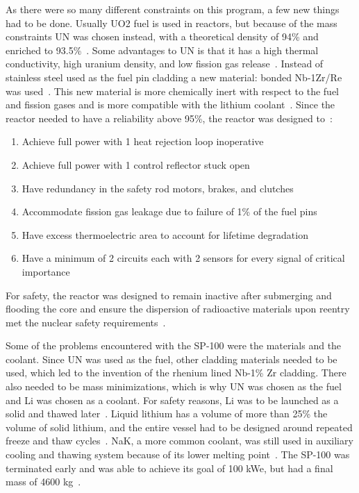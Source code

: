 \documentclass{article}
\begin{document}
As there were so many different constraints on this program, a few new things had to be done. Usually UO2 fuel is used in reactors, but because of the mass constraints UN was chosen instead, with a theoretical density of 94\% and enriched to 93.5\%~\cite{demuth2003sp100}. Some advantages to UN is that it has a high thermal conductivity, high uranium density, and low fission gas release~\cite{el1992decay}. Instead of stainless steel used as the fuel pin cladding a new material: bonded Nb-1Zr/Re was used~\cite{el1992decay}. This new material is more chemically inert with respect to the fuel and fission gases and is more compatible with the lithium coolant~\cite{demuth2003sp100}. Since the reactor needed to have a reliability above 95\%, the reactor was designed to~\cite{demuth2003sp100}:
\begin{enumerate}
\item Achieve full power with 1 heat rejection loop inoperative
\item Achieve full power with 1 control reflector stuck open
\item Have redundancy in the safety rod motors, brakes, and clutches
\item Accommodate fission gas leakage due to failure of 1\% of the fuel pins
\item Have excess thermoelectric area to account for lifetime degradation
\item Have a minimum of 2 circuits each with 2 sensors for every signal of critical importance
\end{enumerate}

For safety, the reactor was designed to remain inactive after submerging and flooding the core and ensure the dispersion of radioactive materials upon reentry met the nuclear safety requirements~\cite{anderson1983power}.


    Some of the problems encountered with the SP-100 were the materials and the coolant. Since UN was used as the fuel, other cladding materials needed to be used, which led to the invention of the rhenium lined Nb-1\% Zr cladding. There also needed to be mass minimizations, which is why UN was chosen as the fuel and Li was chosen as a coolant. For safety reasons, Li was to be launched as a solid and thawed later~\cite{anderson1983power}. Liquid lithium has a volume of more than 25\% the volume of solid lithium, and the entire vessel had to be designed around repeated freeze and thaw cycles~\cite{anderson1983power}. NaK, a more common coolant, was still used in auxiliary cooling and thawing system because of its lower melting point~\cite{anderson1983power}. The SP-100 was terminated early and was able to achieve its goal of 100 kWe, but had a final mass of 4600 kg~\cite{anderson1983power}.
\end{document}
